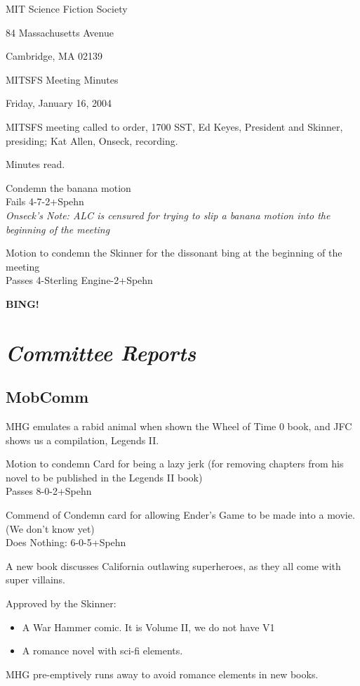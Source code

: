 \documentclass[10pt]{article}
\newcommand{\bing}{{\bf BING!} }
\newcommand{\goto}[1]{\bing \vskip 12pt \section*{{\em{#1}}}}
\begin{document}
\begin{center}

MIT Science Fiction Society 

84 Massachusetts Avenue

Cambridge, MA 02139

\vspace{12pt}

MITSFS Meeting Minutes 

Friday, January 16, 2004

\end{center}
 
\vspace{18pt}

\setlength{\parskip}{6pt}

\noindent
MITSFS meeting called to order, 1700 SST, Ed Keyes, President and
Skinner, presiding; Kat Allen,  Onseck, recording.

Minutes read.

Condemn the banana motion\\
Fails 4-7-2+Spehn\\
\emph{Onseck's Note: ALC is censured for trying to slip a banana motion
into the beginning of the meeting}

Motion to condemn the Skinner for the dissonant bing at the beginning
of the meeting\\
Passes 4-Sterling Engine-2+Spehn

\goto{Committee Reports}
\subsection*{MobComm}
MHG emulates a rabid animal when shown the Wheel of Time 0 book, and
JFC shows us a compilation, Legends II.

Motion to condemn Card for being a lazy jerk (for removing chapters
from his novel to be published in the Legends II book)\\
Passes 8-0-2+Spehn

Commend of Condemn card for allowing Ender's Game to be made into a
movie.(We don't know yet)\\
Does Nothing: 6-0-5+Spehn

A new book discusses California outlawing superheroes, as they all
come with super villains.

Approved by the Skinner:\\
\begin{itemize}
\item A War Hammer comic. It is Volume II, we do not
have V1
\item A romance novel with sci-fi elements.
\end{itemize}
MHG pre-emptively runs away to avoid romance elements in new books.
\end{document}
